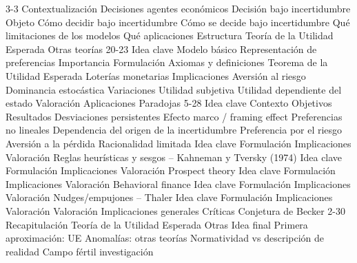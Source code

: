 \documentclass{nuevotema}
\begin{document}
\esquemacorto

\begin{esquema}[enumerate]
	\1[]  3-3
		\2 Contextualización
			\3 Decisiones agentes económicos
			\3 Decisión bajo incertidumbre
		\2 Objeto
			\3 Cómo decidir bajo incertidumbre
			\3 Cómo se decide bajo incertidumbre
			\3 Qué limitaciones de los modelos
			\3 Qué aplicaciones
		\2 Estructura
			\3 Teoría de la Utilidad Esperada
			\3 Otras teorías
	\1  20-23
		\2 Idea clave
			\3 Modelo básico
			\3 Representación de preferencias
			\3 Importancia
		\2 Formulación
			\3 Axiomas y definiciones
			\3 Teorema de la Utilidad Esperada
			\3 Loterías monetarias
		\2 Implicaciones
			\3 Aversión al riesgo
			\3 Dominancia estocástica
		\2 Variaciones
			\3 Utilidad subjetiva
			\3 Utilidad dependiente del estado
		\2 Valoración
			\3 Aplicaciones
			\3 Paradojas
	\1  5-28
		\2 Idea clave
			\3 Contexto
			\3 Objetivos
			\3 Resultados
		\2 Desviaciones persistentes
			\3 Efecto marco / framing effect
			\3 Preferencias no lineales
			\3 Dependencia del origen de la incertidumbre
			\3 Preferencia por el riesgo
			\3 Aversión a la pérdida
		\2 Racionalidad limitada
			\3 Idea clave
			\3 Formulación
			\3 Implicaciones
			\3 Valoración
		\2 Reglas heurísticas y sesgos -- Kahneman y Tversky (1974)
			\3 Idea clave
			\3 Formulación
			\3 Implicaciones
			\3 Valoración
		\2 Prospect theory
			\3 Idea clave
			\3 Formulación
			\3 Implicaciones
			\3 Valoración
		\2 Behavioral finance
			\3 Idea clave
			\3 Formulación
			\3 Implicaciones
			\3 Valoración
		\2 Nudges/empujones -- Thaler
			\3 Idea clave
			\3 Formulación
			\3 Implicaciones
			\3 Valoración
		\2 Valoración
			\3 Implicaciones generales
			\3 Críticas
			\3 Conjetura de Becker
	\1[]  2-30
		\2 Recapitulación
			\3 Teoría de la Utilidad Esperada
			\3 Otras
		\2 Idea final
			\3 Primera aproximación: UE
			\3 Anomalías: otras teorías
			\3 Normatividad vs descripción de realidad
			\3 Campo fértil investigación

\end{esquema}

\esquemalargo
\end{document}

